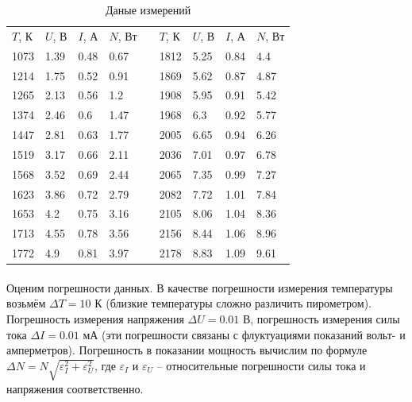 \documentclass[a4paper,12pt]{article} %
\begin{document}
\begin{table}[h]
\centering
\begin{tabular}{|l|l|l|l|l|l|l|l|l|}
\cline{1-4} \cline{6-9}
$T$, К & $U$, В & $I$, А & $N$, Вт &  & $T$, К & $U$, В & $I$, А & $N$, Вт \\ \cline{1-4} \cline{6-9} 
1073   & 1.39   & 0.48   & 0.67    &  & 1812   & 5.25   & 0.84   & 4.4     \\ \cline{1-4} \cline{6-9} 
1214   & 1.75   & 0.52   & 0.91    &  & 1869   & 5.62   & 0.87   & 4.87    \\ \cline{1-4} \cline{6-9} 
1265   & 2.13   & 0.56   & 1.2     &  & 1908   & 5.95   & 0.91   & 5.42    \\ \cline{1-4} \cline{6-9} 
1374   & 2.46   & 0.6    & 1.47    &  & 1968   & 6.3    & 0.92   & 5.77    \\ \cline{1-4} \cline{6-9} 
1447   & 2.81   & 0.63   & 1.77    &  & 2005   & 6.65   & 0.94   & 6.26    \\ \cline{1-4} \cline{6-9} 
1519   & 3.17   & 0.66   & 2.11    &  & 2036   & 7.01   & 0.97   & 6.78    \\ \cline{1-4} \cline{6-9} 
1568   & 3.52   & 0.69   & 2.44    &  & 2065   & 7.35   & 0.99   & 7.27    \\ \cline{1-4} \cline{6-9} 
1623   & 3.86   & 0.72   & 2.79    &  & 2082   & 7.72   & 1.01   & 7.84    \\ \cline{1-4} \cline{6-9} 
1653   & 4.2    & 0.75   & 3.16    &  & 2105   & 8.06   & 1.04   & 8.36    \\ \cline{1-4} \cline{6-9} 
1713   & 4.55   & 0.78   & 3.56    &  & 2156   & 8.44   & 1.06   & 8.96    \\ \cline{1-4} \cline{6-9} 
1772   & 4.9    & 0.81   & 3.97    &  & 2178   & 8.83   & 1.09   & 9.61    \\ \cline{1-4} \cline{6-9} 
\end{tabular}
\caption{Даные измерений}
\label{tab:exp3}
\end{table}

\paragraph{} Оценим погрешности данных. В качестве погрешности измерения температуры возьмём $\Delta T = 10$ К (близкие температуры сложно различить пирометром). Погрешность измерения напряжения $\Delta U = 0.01$ В, погрешность измерения силы тока $\Delta I = 0.01$ мА (эти погрешности связаны с флуктуациями показаний вольт- и амперметров). Погрешность в показании мощность вычислим по формуле $\Delta N = N \sqrt{\varepsilon_I^2 + \varepsilon_U^2}$, где $\varepsilon_I$ и $\varepsilon_U$ -- относительные погрешности силы тока и напряжения соответственно.
\end{document}
